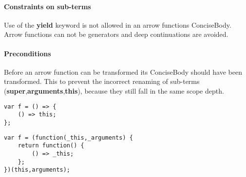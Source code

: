 \paragraph{Constraints on sub-terms}
Use of the \textbf{yield} keyword is not allowed in an arrow functions ConciseBody. Arrow functions can not be generators and deep continuations are avoided.

\paragraph{Preconditions}
Before an arrow function can be transformed its ConciseBody should have been transformed. This to prevent the incorrect renaming of sub-terms (\textbf{super},\textbf{arguments},\textbf{this}), because they still fall in the same scope depth.

\begin{lstlisting}
var f = () => {
	() => this;
};
\end{lstlisting}

\begin{lstlisting}[caption={Incorrect renaming of this in nested arrow function}]
var f = (function(_this,_arguments) {
	return function() {	
		() => _this;
	};
})(this,arguments);
\end{lstlisting}

